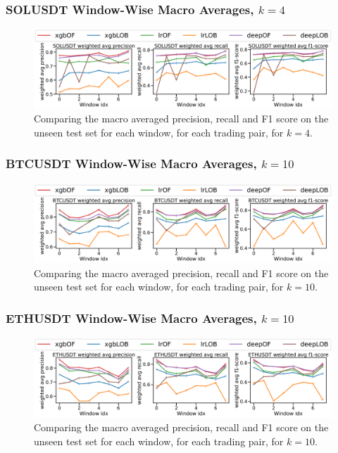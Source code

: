 \documentclass[handout]{beamer}
\begin{document}
\begin{frame}
    \frametitle{SOLUSDT Window-Wise Macro Averages, $k=4$}
    \begin{figure}[htpb!]
        \centering
        \includegraphics[width=1.0\textwidth]{./images/SOLUSDT_macro_results_k=4.pdf}
        \caption{Comparing the macro averaged precision, recall and F1 score on the unseen test set for each window, for each trading pair, for $k=4$.}
        
    \end{figure}
\end{frame}


\begin{frame}
    \frametitle{BTCUSDT Window-Wise Macro Averages, $k=10$}
    \begin{figure}[htpb!]
        \centering
        \includegraphics[width=1.0\textwidth]{./images/BTCUSDT_macro_results_k=10.pdf}
        \caption{Comparing the macro averaged precision, recall and F1 score on the unseen test set for each window, for each trading pair, for $k=10$.}
        
    \end{figure}
\end{frame}

\begin{frame}
    \frametitle{ETHUSDT Window-Wise Macro Averages, $k=10$}
    \begin{figure}[htpb!]
        \centering
        \includegraphics[width=1.0\textwidth]{./images/ETHUSDT_macro_results_k=10.pdf}
        \caption{Comparing the macro averaged precision, recall and F1 score on the unseen test set for each window, for each trading pair, for $k=10$.}
        
    \end{figure}
\end{frame}
\end{document}
